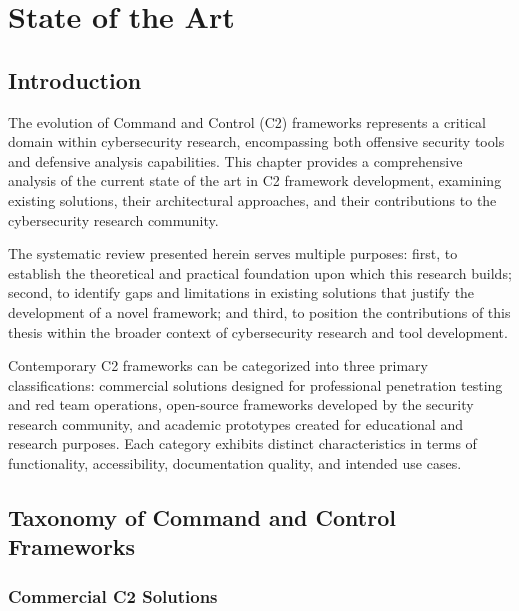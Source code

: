 \chapter{State of the Art}
\label{chapter:state_of_art}

\section{Introduction}
\label{sec:sota_introduction}

The evolution of Command and Control (C2) frameworks represents a critical domain within cybersecurity research, encompassing both offensive security tools and defensive analysis capabilities. This chapter provides a comprehensive analysis of the current state of the art in C2 framework development, examining existing solutions, their architectural approaches, and their contributions to the cybersecurity research community.

The systematic review presented herein serves multiple purposes: first, to establish the theoretical and practical foundation upon which this research builds; second, to identify gaps and limitations in existing solutions that justify the development of a novel framework; and third, to position the contributions of this thesis within the broader context of cybersecurity research and tool development.

Contemporary C2 frameworks can be categorized into three primary classifications: commercial solutions designed for professional penetration testing and red team operations, open-source frameworks developed by the security research community, and academic prototypes created for educational and research purposes. Each category exhibits distinct characteristics in terms of functionality, accessibility, documentation quality, and intended use cases.

\section{Taxonomy of Command and Control Frameworks}
\label{sec:c2_taxonomy}

\subsection{Commercial C2 Solutions}
\label{subsec:commercial_solutions}

